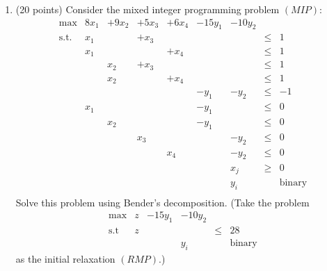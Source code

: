\begin{enumerate}
   \item (20 points)
Consider the mixed integer programming problem $(MIP)$:
     \begin{displaymath}
       \begin{array}{lrrrrrrcl}
         \max         & 8x_1 & +9x_2 & +5x_3 & +6x_4 & -15y_1 & -10y_2 \\
         \mbox{s.t. } & x_1 &&  +x_3 &&&& \leq & 1 \\
                      & x_1 &&& +x_4  &&& \leq & 1 \\
                      && x_2 &  +x_3 &&&& \leq & 1 \\
                      && x_2 && +x_4  &&& \leq & 1 \\
                      &&&&& -y_1 & -y_2 & \leq & -1 \\
                      &    x_1 &&&&  -y_1 && \leq & 0 \\
                      &&   x_2  &&&  -y_1 && \leq & 0 \\
                      &&&   x_3   &&& -y_2 & \leq & 0 \\
                      &&&&  x_4    && -y_2 & \leq & 0 \\
                      &&&&&& x_j & \geq & 0  \\
                      &&&&&& y_i && \mbox{binary} \\
       \end{array}
     \end{displaymath}
     Solve this problem using Bender's decomposition.
     (Take the problem
     \begin{displaymath}
       \begin{array}{lrrrcl}
         \max         & z & -15y_1 & -10y_2 \\
         \mbox{s.t}   & z &&& \leq & 28 \\
                      &&& y_i && \mbox{binary}
       \end{array}
     \end{displaymath}
     as the initial relaxation $(RMP)$.)


\end{enumerate}
